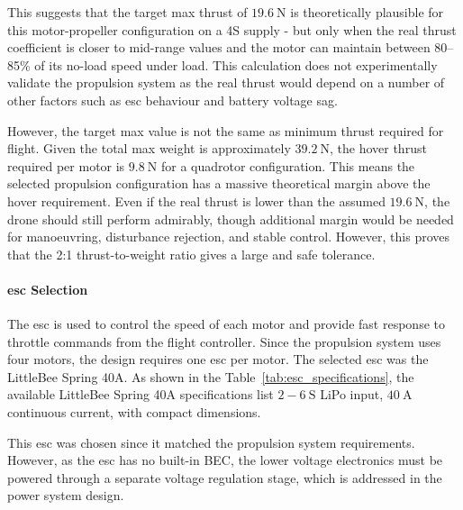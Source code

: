 \documentclass{report_template_oxford}
\begin{document}
This suggests that the target max thrust of \(19.6~\text{N}\) is theoretically plausible for this motor-propeller configuration on a 4S supply - but only when the real thrust coefficient is closer to mid-range values and the motor can maintain between 80--85\% of its no-load speed under load. This calculation does not experimentally validate the propulsion system as the real thrust would depend on a number of other factors such as \gls{esc} behaviour and battery voltage sag. 

However, the target max value is not the same as minimum thrust required for flight. Given the total max weight is approximately \(39.2~\text{N}\), the hover thrust required per motor is \(9.8~\text{N}\) for a quadrotor configuration. This means the selected propulsion configuration has a massive theoretical margin above the hover requirement. Even if the real thrust is lower than the assumed \(19.6~\text{N}\), the drone should still perform admirably, though additional margin would be needed for manoeuvring, disturbance rejection, and stable control. However, this proves that the 2:1 thrust-to-weight ratio gives a large and safe tolerance.

\paragraph{\gls{esc} Selection}

The \gls{esc} is used to control the speed of each motor and provide fast response to throttle commands from the flight controller. Since the propulsion system uses four motors, the design requires one \gls{esc} per motor. The selected \gls{esc} was the LittleBee Spring 40A. As shown in the Table~\ref{tab:esc_specifications}, the available LittleBee Spring 40A specifications list \(2-6~\text{S}\) LiPo input, \(40~\text{A}\) continuous current, with compact dimensions.

This \gls{esc} was chosen since it matched the propulsion system requirements. However, as the \gls{esc} has no built-in BEC, the lower voltage electronics must be powered through a separate voltage regulation stage, which is addressed in the power system design.
\end{document}
